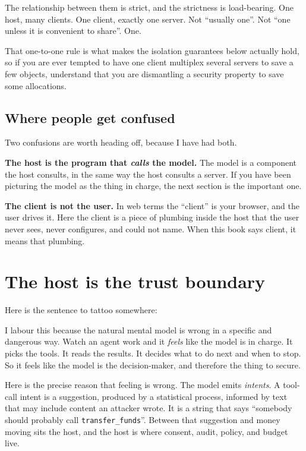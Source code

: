 The relationship between them is strict, and the strictness is load-bearing. One
host, many clients. One client, exactly one server. Not ``usually one''. Not
``one unless it is convenient to share''. One.

That one-to-one rule is what makes the isolation guarantees below actually hold,
so if you are ever tempted to have one client multiplex several servers to save
a few objects, understand that you are dismantling a security property to save
some allocations.

\subsection{Where people get confused}

Two confusions are worth heading off, because I have had both.

\textbf{The host is the program that \emph{calls} the model.} The model is a
component the host consults, in the same way the host consults a server. If you
have been picturing the model as the thing in charge, the next section is the
important one.

\textbf{The client is not the user.} In web terms the ``client'' is your
browser, and the user drives it. Here the client is a piece of plumbing inside
the host that the user never sees, never configures, and could not name. When
this book says client, it means that plumbing.

\section{The host is the trust boundary}

Here is the sentence to tattoo somewhere:


I labour this because the natural mental model is wrong in a specific and
dangerous way. Watch an agent work and it \emph{feels} like the model is in
charge. It picks the tools. It reads the results. It decides what to do next and
when to stop. So it feels like the model is the decision-maker, and therefore the
thing to secure.

Here is the precise reason that feeling is wrong. The model emits
\emph{intents}. A tool-call intent is a suggestion, produced by a statistical
process, informed by text that may include content an attacker wrote. It is a string that says
``somebody should probably call \texttt{transfer\_funds}''. Between that
suggestion and money moving sits the host, and the host is where consent, audit,
policy, and budget live.

